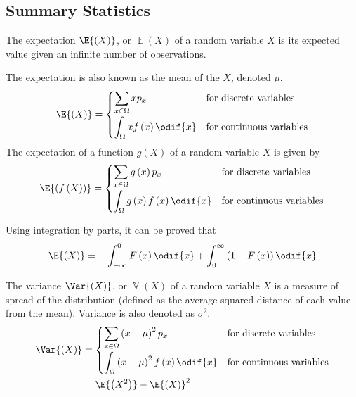 \documentclass{article}
\begin{document}
\subsection{Summary Statistics}
\begin{definition}[Expectation]
    The expectation \(\E{\left( X \right)}\), or \(\operatorname{\mathbb{E}}{\left( X \right)}\)
    of a random variable \(X\) is its expected value given an
    infinite number of observations.

    The expectation is also known as the mean of the \(X\), denoted \(\mu\).
    \begin{equation*}
        \E{\left( X \right)} =
        \begin{cases}
            \displaystyle \sum_{x \in \Omega} x p_x                & \text{for discrete variables}   \\[0.4cm]
            \displaystyle \int_\Omega x f\left( x \right) \odif{x} & \text{for continuous variables}
        \end{cases}
    \end{equation*}
    The expectation of a function \(g\left( X \right)\) of a random variable \(X\) is given by
    \begin{equation*}
        \E{\left( f\left( X \right) \right)} =
        \begin{cases}
            \displaystyle \sum_{x \in \Omega} g\left( x \right) p_x                & \text{for discrete variables}   \\[0.4cm]
            \displaystyle \int_\Omega g\left( x \right) f\left( x \right) \odif{x} & \text{for continuous variables}
        \end{cases}
    \end{equation*}
\end{definition}
\begin{theorem}
    Using integration by parts, it can be proved that
    \begin{equation*}
        \E{\left(X\right)} = -\int_{-\infty}^0 F\left( x \right) \odif{x} + \int_0^\infty \left(1 - F\left( x \right)\right) \odif{x}
    \end{equation*}
\end{theorem}
\begin{definition}[Variance]
    The variance \(\Var{\left( X \right)}\), or \(\operatorname{\mathbb{V}}{\left( X \right)}\) of a random variable \(X\) is a measure of spread
    of the distribution (defined as the average squared distance of each value from the mean).
    Variance is also denoted as \(\sigma^2\).
    \begin{align*}
        \Var{\left( X \right)} & =
        \begin{cases}
            \displaystyle \sum_{x \in \Omega} \left( x - \mu \right)^2 p_x                  & \text{for discrete variables}   \\[0.4cm]
            \displaystyle \int_{\Omega} \left( x - \mu \right)^2 f\left( x \right) \odif{x} & \text{for continuous variables}
        \end{cases} \\
                               & = \E{\left( X^2 \right)} - \E{\left( X \right)}^2
    \end{align*}
\end{definition}
\end{document}
